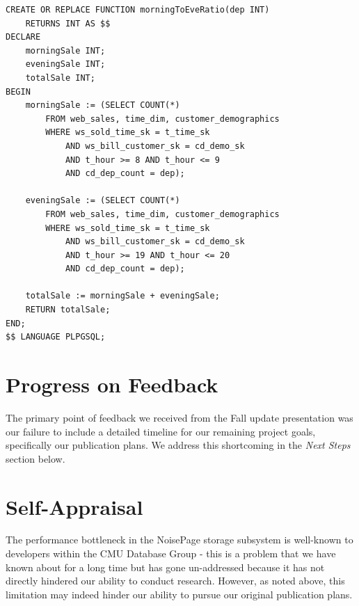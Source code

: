 \documentclass{vldb}
\newcommand{\dbCode}[1]{{\sffamily\small \textbf{#1}}\xspace}
\begin{document}
\begin{listing}
    \begin{verbatim}
CREATE OR REPLACE FUNCTION morningToEveRatio(dep INT) 
    RETURNS INT AS $$
DECLARE
    morningSale INT;
    eveningSale INT;
    totalSale INT;
BEGIN
    morningSale := (SELECT COUNT(*)
        FROM web_sales, time_dim, customer_demographics
        WHERE ws_sold_time_sk = t_time_sk 
            AND ws_bill_customer_sk = cd_demo_sk
            AND t_hour >= 8 AND t_hour <= 9
            AND cd_dep_count = dep);

    eveningSale := (SELECT COUNT(*)
        FROM web_sales, time_dim, customer_demographics 
        WHERE ws_sold_time_sk = t_time_sk 
            AND ws_bill_customer_sk = cd_demo_sk
            AND t_hour >= 19 AND t_hour <= 20
            AND cd_dep_count = dep);

    totalSale := morningSale + eveningSale;
    RETURN totalSale;
END; 
$$ LANGUAGE PLPGSQL;
    \end{verbatim}
    \caption{The definition of ProcBench UDF \dbCode{05}.}
    \label{list:udf_procbench_05}
\end{listing}


\section{Progress on Feedback}

The primary point of feedback we received from the Fall update presentation was our failure to include a detailed timeline for our remaining project goals, specifically our publication plans. We address this shortcoming in the \textit{Next Steps} section below.


\section{Self-Appraisal}

The performance bottleneck in the NoisePage storage subsystem is well-known to developers within the CMU Database Group - this is a problem that we have known about for a long time but has gone un-addressed because it has not directly hindered our ability to conduct research. However, as noted above, this limitation may indeed hinder our ability to pursue our original publication plans.
\end{document}
